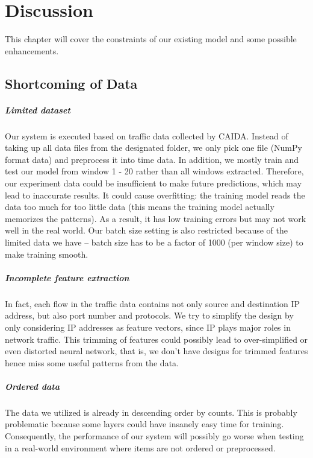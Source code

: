 \chapter{Discussion}
\label{chapter:discussion}

This chapter will cover the constraints of our existing model and some possible enhancements. 

\section{Shortcoming of Data}
\paragraph{Limited dataset}
Our system is executed based on traffic data collected by CAIDA. Instead of taking up all data files from the designated folder, we only pick one file (NumPy format data) and preprocess it into time data. In addition, we mostly train and test our model from window 1 - 20 rather than all windows extracted. Therefore, our experiment data could be insufficient to make future predictions, which may lead to inaccurate results. It could cause overfitting: the training model reads the data too much for too little data (this means the training model actually memorizes the patterns). As a result, it has low training errors but may not work well in the real world. Our batch size setting is also restricted because of the limited data we have -- batch size has to be a factor of 1000 (per window size) to make training smooth.

\paragraph{Incomplete feature extraction}
In fact, each flow in the traffic data contains not only source and destination IP address, but also port number and protocols. We try to simplify the design by only considering IP addresses as feature vectors, since IP plays major roles in network traffic. This trimming of features could possibly lead to over-simplified or even distorted neural network, that is, we don't have designs for trimmed features hence miss some useful patterns from the data.

\paragraph{Ordered data}
The data we utilized is already in descending order by counts. This is probably problematic because some layers could have insanely easy time for training. Consequently, the performance of our system will possibly go worse when testing in a
real-world environment where items are not ordered or preprocessed.


